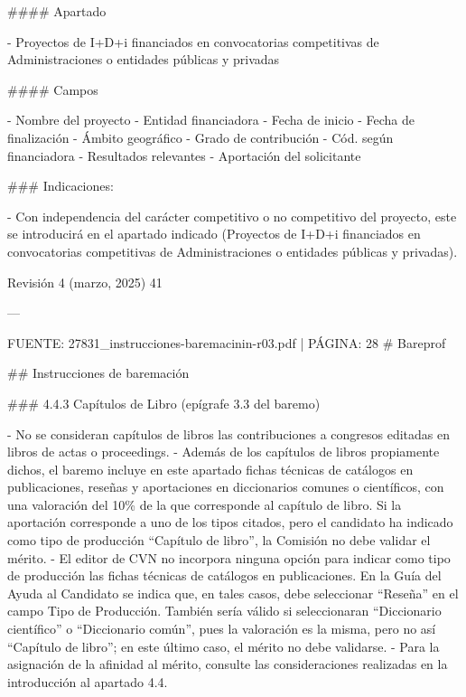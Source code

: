\documentclass{article}
\begin{document}
\begin{itemize}
\begin{itemize}
\begin{scriptsize}
                  \#\#\#\# Apartado

                  - Proyectos de I+D+i financiados en convocatorias competitivas de Administraciones o entidades públicas y privadas

                  \#\#\#\# Campos

                  - Nombre del proyecto
                  - Entidad financiadora
                  - Fecha de inicio
                  - Fecha de finalización
                  - Ámbito geográfico
                  - Grado de contribución
                  - Cód. según financiadora
                  - Resultados relevantes
                  - Aportación del solicitante

                  \#\#\# Indicaciones:

                  - Con independencia del carácter competitivo o no competitivo del proyecto, este se introducirá en el apartado indicado (Proyectos de I+D+i financiados en convocatorias competitivas de Administraciones o entidades públicas y privadas).

                  Revisión 4 (marzo, 2025) 41

                  ---

                  FUENTE: 27831\_instrucciones-baremacinin-r03.pdf | PÁGINA: 28
                  \# Bareprof

                  \#\# Instrucciones de baremación

                  \#\#\# 4.4.3 Capítulos de Libro (epígrafe 3.3 del baremo)

                  - No se consideran capítulos de libros las contribuciones a congresos editadas en libros de actas o proceedings.
                  - Además de los capítulos de libros propiamente dichos, el baremo incluye en este apartado fichas técnicas de catálogos en publicaciones, reseñas y aportaciones en diccionarios comunes o científicos, con una valoración del 10\% de la que corresponde al capítulo de libro. Si la aportación corresponde a uno de los tipos citados, pero el candidato ha indicado como tipo de producción “Capítulo de libro”, la Comisión no debe validar el mérito.
                  - El editor de CVN no incorpora ninguna opción para indicar como tipo de producción las fichas técnicas de catálogos en publicaciones. En la Guía del Ayuda al Candidato se indica que, en tales casos, debe seleccionar “Reseña” en el campo Tipo de Producción. También sería válido si seleccionaran “Diccionario científico” o “Diccionario común”, pues la valoración es la misma, pero no así “Capítulo de libro”; en este último caso, el mérito no debe validarse.
                  - Para la asignación de la afinidad al mérito, consulte las consideraciones realizadas en la introducción al apartado 4.4.


\end{scriptsize}
\end{itemize}
\end{itemize}
\end{document}
